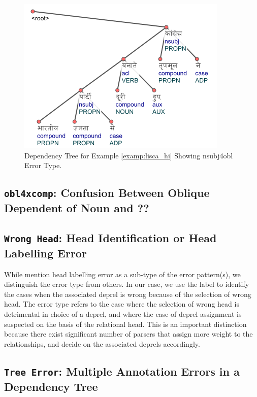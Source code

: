\begin{figure}[h]
    \centering
    \includegraphics[scale=0.90]{img/lisca_nsubj4obl.png}
    \caption{Dependency Tree for Example \ref{examp:lisca_hi} Showing nsubj4obl Error Type.}
    \label{fig:lisca_nsubj4obl}
\end{figure}

\subsection[Confusion Between Oblique Dependent of Noun and ??: \texttt{obl4xcomp}]{\texttt{obl4xcomp}: Confusion Between Oblique Dependent of Noun and ??}


\subsection[Head Identification or Head Labelling Error: \texttt{Wrong Head}]{\texttt{Wrong Head}: Head Identification or Head Labelling Error}
\label{error:wrongHead}

While \citeauthor{alzetta2017dangerous} mention head labelling error as a sub-type of the error pattern(s), we distinguish the error type from others. In our case, we use the label to identify the cases when the associated deprel is wrong because of the selection of wrong head. The error type refers to the case where the selection of wrong head is detrimental in choice of a deprel, and where the case of deprel assignment is suspected on the basis of the relational head. This is an important distinction because there exist significant number of parsers that assign more weight to the relationships, and decide on the associated deprels accordingly.

\subsection[Multiple Annotation Errors in a Dependency Tree: \texttt{Tree Error}]{\texttt{Tree Error}: Multiple Annotation Errors in a Dependency Tree}
\label{error:treeError}

